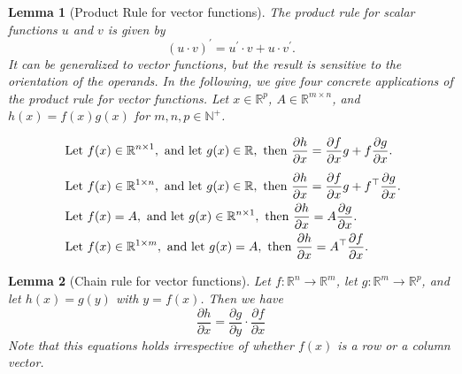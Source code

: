 \documentclass{article}
\newtheorem{lemma}{Lemma}
\newcommand{\Derivative}[2]{\ensuremath{\frac{\partial #1}{\partial #2}}}
\newcommand{\Reals}{\mathbb{R}}
\begin{document}
\begin{lemma}[Product Rule for vector functions] \label{lemma:product-rule}
The product rule for scalar functions $u$ and $v$ is given by
\[
(u \cdot v)^{\prime} = u^{\prime} \cdot v + u \cdot v^{\prime}.
\]
It can be generalized to vector functions, but the result is sensitive to the orientation of the operands. In the following, we give four concrete applications of the product rule for vector functions.
Let $x \in \Reals^{p}$, $A \in \Reals^{m \times n}$, and $h(x) = f(x) g(x)$ for $m, n, p \in \mathbb{N}^{+}$.
\begin{table}[h]
\begin{alignat}{2}
&
\text{ Let } f(x) \in \Reals^{n \times 1},
\text{ and let } g(x) \in \Reals, 
\text{ then }
\Derivative{h}{x} = \Derivative{f}{x} g + f \Derivative{g}{x}.
\label{eq:product-rule1}
\\ \addlinespace[1ex]
&
\text{ Let } f(x) \in \Reals^{1 \times n},
\text{ and let } g(x) \in \Reals,
\text{ then }
\Derivative{h}{x} = \Derivative{f}{x} g + f^\top \Derivative{g}{x}.
\label{eq:product-rule2}
\\
&
\text{ Let } f(x) = A,
\text{ and let } g(x) \in \Reals^{n \times 1},
\text{ then }
\Derivative{h}{x} = A \Derivative{g}{x}.
\label{eq:product-rule3}
\\
&
\text{ Let } f(x) \in \Reals^{1 \times m},
\text{ and let } g(x) = A,
\text{ then }
\Derivative{h}{x} = A^\top \Derivative{f}{x}.
\label{eq:product-rule4}
\end{alignat}
\label{table:product-rule}
\end{table}
\end{lemma}

\begin{lemma}[Chain rule for vector functions] \label{lemma:chain-rule}
    Let $f: \Reals^n \rightarrow \Reals^m$, let 
    $g: \Reals^m \rightarrow \Reals^p$,
    and let $h(x) = g(y)$ with $y = f(x)$. Then we have
    \begin{equation} \label{eq:chain-rule}
       \frac{\partial h}{\partial x} = 
       \frac{\partial g}{\partial y} \cdot
       \frac{\partial f}{\partial x}
    \end{equation}
    Note that this equations holds irrespective of whether $f(x)$ is a row or a column vector.
\end{lemma}
\vspace{0.3cm}
\end{document}
